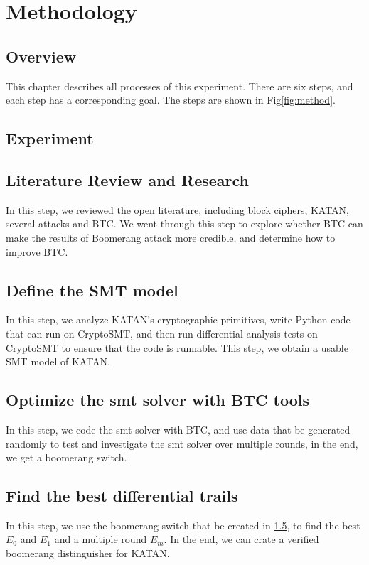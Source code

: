 \chapter{Methodology}\label{chap:methodology}
\section{Overview}
This chapter describes all processes of this experiment. There are six steps, and each step has a corresponding goal. The steps are shown in Fig\ref{fig:method}. 


\section{Experiment}\label{sec:experiment}

\section{Literature Review and Research}
In this step, we reviewed the open literature, including block ciphers, KATAN, several attacks and BTC. We went through this step to explore whether BTC can make the results of Boomerang attack more credible, and determine how to improve BTC.

\section{Define the SMT model}
In this step, we analyze KATAN's cryptographic primitives, write Python code that can run on CryptoSMT, and then run differential analysis tests on CryptoSMT to ensure that the code is runnable. This step, we obtain a usable SMT model of KATAN.

\section{Optimize the smt solver with BTC tools}\label{m3}
In this step, we code the smt solver with BTC, and use data that be generated randomly to test and investigate the smt solver over multiple rounds, in the end, we get a boomerang switch.

\section{Find the best differential trails}\label{m4}
In this step, we use the boomerang switch that be created in \ref{m3}, to find the best $E_0$ and $E_1$ and a multiple round $E_m$. In the end, we can crate a verified boomerang distinguisher for KATAN.


